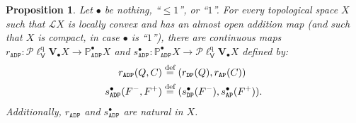 \documentclass[preprint,12pt]{elsarticle}
\newcommand\eqdef{\mathrel{\buildrel \text{def}\over=}}
\newcommand\Lform{\mathcal L}
\newcommand\Pred{\mathbb{P}}
\newcommand\Angel{{\mathtt{A}}}
\newcommand\Demon{{\mathtt{D}}}
\newcommand\Nature{{\mathtt{P}}}
\newcommand\AN{{\Angel\Nature}}
\newcommand\DN{{\Demon\Nature}}
\newcommand\ADN{{\Angel\Demon\Nature}}
\newcommand\Vt{\mathsf{V}}
\newcommand\quasi{\mathrm{q}} %
\newcommand\QL{\Plotkin^\quasi}
\newcommand\QLV{\QL_\Vt}
\newcommand\Plotkin{\mathcal P\ell} %
\newcommand\Val{{\mathbf V}}
\newtheorem{proposition}[theorem]{Proposition}
\begin{document}
\begin{proposition}
  \label{prop:rADP}
  Let $\bullet$ be nothing, ``$\leq 1$'', or ``$1$''.  For every
  topological space $X$ such that $\Lform X$ is locally convex and has
  an almost open addition map (and such that $X$ is compact, in case
  $\bullet$ is ``$1$''), there are continuous maps
  $r_\ADN \colon \QLV {\Val_\bullet X} \to \Pred_\ADN^\bullet X$ and
  $s_\ADN^\bullet \colon \Pred_\ADN^\bullet X \to \QLV {\Val_\bullet
    X}$ defined by:
  \begin{align*}
    r_\ADN (Q, C)
    & \eqdef (r_\DN (Q), r_\AN (C)) \\
    s_\ADN^\bullet (F^-, F^+)
    & \eqdef (s_\DN^\bullet (F^-), s_\AN^\bullet (F^+)).
  \end{align*}
  Additionally, $r_\ADN$ and $s_\ADN^\bullet$ are natural in $X$.
\end{proposition}
\end{document}
